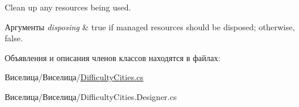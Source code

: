 Clean up any resources being used. 


\begin{DoxyParams}{Аргументы}
{\em disposing} & true if managed resources should be disposed; otherwise, false.\\
\hline
\end{DoxyParams}


Объявления и описания членов классов находятся в файлах\+:\begin{DoxyCompactItemize}
\item 
Виселица/Виселица/\hyperlink{_difficulty_cities_8cs}{Difficulty\+Cities.\+cs}\item 
Виселица/Виселица/Difficulty\+Cities.\+Designer.\+cs\end{DoxyCompactItemize}

